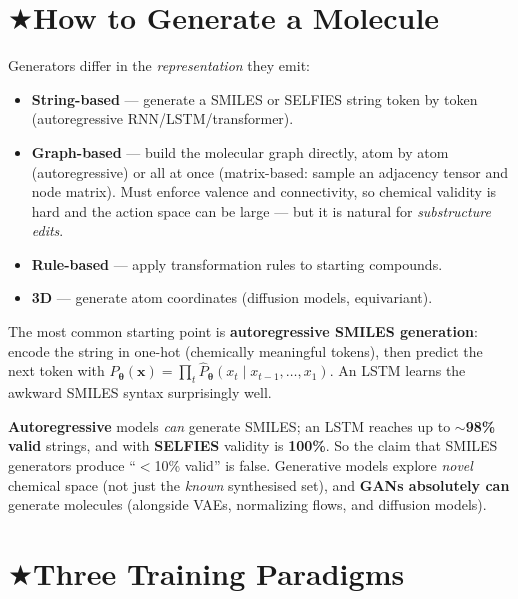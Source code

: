 \documentclass[11pt, oneside]{book}
\makeatletter
\newcommand{\starglyph}{\textcolor{stargold}{\ensuremath{\bigstar}}}
\newcommand{\starsec}[1]{%
  \texorpdfstring{\starglyph\hspace{0.4em}\textcolor{star@frame}{#1}}{#1}}
\newcommand{\params}{\boldsymbol{\theta}}   %
\newcommand{\xvec}{\mathbf{x}}
\makeatother
\begin{document}
\section{\starsec{How to Generate a Molecule}}

Generators differ in the \emph{representation} they emit:

\begin{itemize}
  \item \textbf{String-based} --- generate a SMILES or SELFIES string token by
        token (autoregressive RNN/LSTM/transformer).
  \item \textbf{Graph-based} --- build the molecular graph directly, atom by atom
        (autoregressive) or all at once (matrix-based: sample an adjacency tensor
        and node matrix). Must enforce valence and connectivity, so chemical validity
        is hard and the action space can be large --- but it is natural for
        \emph{substructure edits}.
  \item \textbf{Rule-based} --- apply transformation rules to starting compounds.
  \item \textbf{3D} --- generate atom coordinates (diffusion models, equivariant).
\end{itemize}

The most common starting point is \textbf{autoregressive SMILES generation}: encode
the string in one-hot (chemically meaningful tokens), then predict the next token
with $\hat P_{\params}(\xvec) = \prod_t \hat P_{\params}(x_t \mid x_{t-1},\dots,x_1)$.
An LSTM learns the awkward SMILES syntax surprisingly well.

\begin{notebox}[title={Generative models --- the facts the exam loves}]
\textbf{Autoregressive} models \emph{can} generate SMILES; an LSTM reaches up to
$\sim$\textbf{98\% valid} strings, and with \textbf{SELFIES} validity is
\textbf{100\%}. So the claim that SMILES generators produce ``$<$10\% valid'' is
false. Generative models explore \emph{novel} chemical space (not just the
\emph{known} synthesised set), and \textbf{GANs absolutely can} generate molecules
(alongside VAEs, normalizing flows, and diffusion models).
\end{notebox}

\newpage

\section{\starsec{Three Training Paradigms}}
\end{document}
